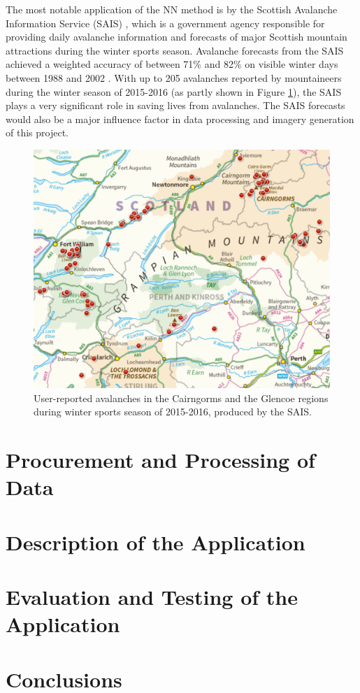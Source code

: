 \documentclass[openany]{UoYCSproject}
\begin{document}
The most notable application of the NN method is by the Scottish Avalanche Information Service (SAIS) \cite{sais}, which is a government agency responsible for providing daily avalanche information and forecasts of major Scottish mountain attractions during the winter sports season. Avalanche forecasts from the SAIS achieved a weighted accuracy of between 71\% and 82\% on visible winter days between 1988 and 2002 \cite[p. 351] {Purves2003343}. With up to 205 avalanches reported by mountaineers during the winter season of 2015-2016 \cite{sais} (as partly shown in Figure \ref{fig:scotava1516}), the SAIS plays a very significant role in saving lives from avalanches. The SAIS forecasts would also be a major influence factor in data processing and imagery generation of this project.

\begin{figure}[h]
		\centering
		\includegraphics[scale=0.4]{ScotAvalanches1516.png}
		\caption{\label{fig:scotava1516} User-reported avalanches in the Cairngorms and the Glencoe regions during winter sports season of 2015-2016, produced by the SAIS.\cite{sais-map}}
\end{figure}


\chapter{Procurement and Processing of Data} \label{ch:data}

\chapter{Description of the Application} \label{ch:app-description}

\chapter{Evaluation and Testing of the Application} \label{ch:app-testing}

\chapter{Conclusions} \label{ch:conclusions}

\small{}
\end{document}
